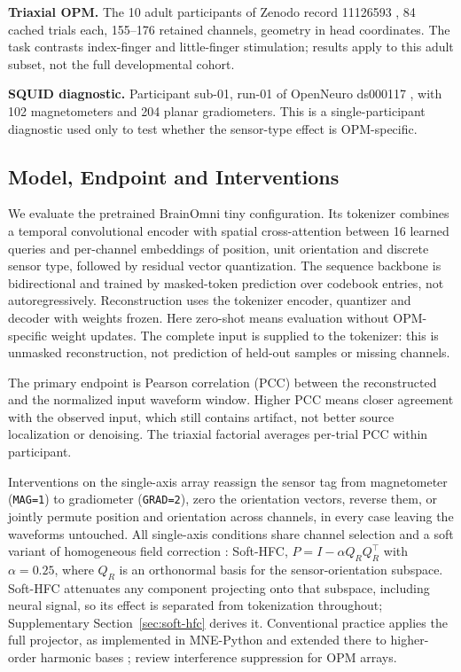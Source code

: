 \noindent \textbf{Triaxial OPM.} The 10 adult participants of Zenodo record 11126593 \citep{rier2024dataset}, 84 cached trials each, 155--176 retained channels, geometry in head coordinates. The task contrasts index-finger and little-finger stimulation; results apply to this adult subset, not the full developmental cohort.

\noindent \textbf{SQUID diagnostic.} Participant sub-01, run-01 of OpenNeuro ds000117 \citep{wakeman2015}, with 102 magnetometers and 204 planar gradiometers. This is a single-participant diagnostic used only to test whether the sensor-type effect is OPM-specific.

\subsection{Model, Endpoint and Interventions}
We evaluate the pretrained BrainOmni tiny configuration. Its tokenizer combines a temporal convolutional encoder with spatial cross-attention between 16 learned queries and per-channel embeddings of position, unit orientation and discrete sensor type, followed by residual vector quantization. The sequence backbone is bidirectional and trained by masked-token prediction over codebook entries, not autoregressively. Reconstruction uses the tokenizer encoder, quantizer and decoder with weights frozen. Here zero-shot means evaluation without OPM-specific weight updates. The complete input is supplied to the tokenizer: this is unmasked reconstruction, not prediction of held-out samples or missing channels.

The primary endpoint is Pearson correlation (PCC) between the reconstructed and the normalized input waveform window. Higher PCC means closer agreement with the observed input, which still contains artifact, not better source localization or denoising. The triaxial factorial averages per-trial PCC within participant.

Interventions on the single-axis array reassign the sensor tag from magnetometer (\texttt{MAG=1}) to gradiometer (\texttt{GRAD=2}), zero the orientation vectors, reverse them, or jointly permute position and orientation across channels, in every case leaving the waveforms untouched. All single-axis conditions share channel selection and a soft variant of homogeneous field correction \citep{tierney2021hfc}: Soft-HFC, $P = I - \alpha Q_R Q_R^{\top}$ with $\alpha = 0.25$, where $Q_R$ is an orthonormal basis for the sensor-orientation subspace. Soft-HFC attenuates any component projecting onto that subspace, including neural signal, so its effect is separated from tokenization throughout; Supplementary Section~\ref{sec:soft-hfc} derives it. Conventional practice applies the full projector, as implemented in MNE-Python \citep{mneopmtutorial} and extended there to higher-order harmonic bases \citep{tierney2022harmonic}; \citet{seymour2022interference} review interference suppression for OPM arrays.

